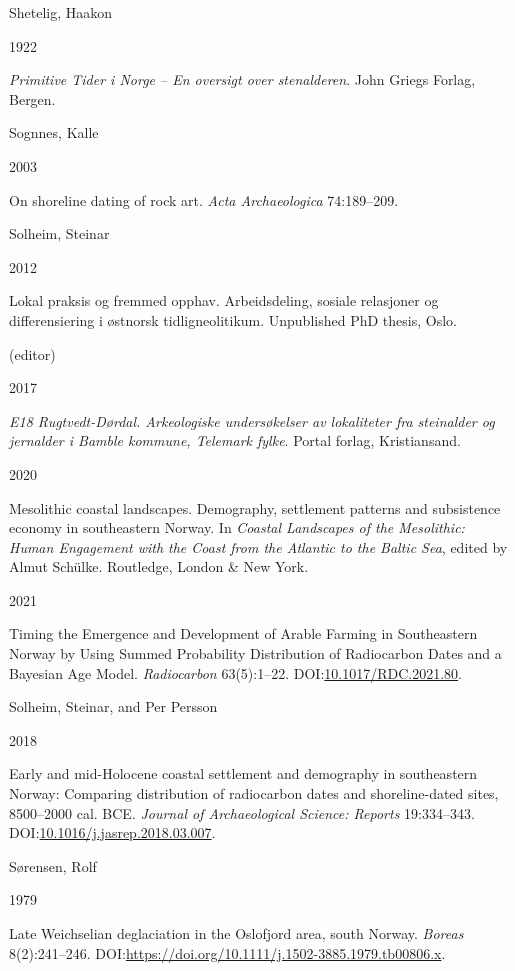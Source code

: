 \documentclass[
]{article}
\newlength{\cslhangindent}
\newlength{\csllabelwidth}
\newlength{\cslentryspacingunit} %
\newenvironment{CSLReferences}[2] %
 {%
  \setlength{\parindent}{0pt}
  \ifodd #1
  \let\oldpar\par
  \def\par{\hangindent=\cslhangindent\oldpar}
  \fi
  \setlength{\parskip}{#2\cslentryspacingunit}
 }%
 {}
\newcommand{\CSLBlock}[1]{#1\hfill\break}
\newcommand{\CSLLeftMargin}[1]{\parbox[t]{\csllabelwidth}{#1}}
\newcommand{\CSLRightInline}[1]{\parbox[t]{\linewidth - \csllabelwidth}{#1}\break}
\begin{document}
\begin{CSLReferences}{0}{0}
\leavevmode{}%
\CSLBlock{Shetelig, Haakon}
\CSLLeftMargin{ 1922}
\CSLRightInline{\emph{{Primitive Tider i Norge -- En oversigt over stenalderen}}. John Griegs Forlag, Bergen.}

\leavevmode{}%
\CSLBlock{Sognnes, Kalle}
\CSLLeftMargin{ 2003}
\CSLRightInline{On shoreline dating of rock art. \emph{Acta Archaeologica} 74:189--209.}

\leavevmode{}%
\CSLBlock{Solheim, Steinar}
\CSLLeftMargin{ 2012}
\CSLRightInline{{Lokal praksis og fremmed opphav. Arbeidsdeling, sosiale relasjoner og differensiering i østnorsk tidligneolitikum}. Unpublished PhD thesis, Oslo.}

\leavevmode{}%
\CSLBlock{ (editor)}
\CSLLeftMargin{ 2017}
\CSLRightInline{\emph{{E18 Rugtvedt-Dørdal. Arkeologiske undersøkelser av lokaliteter fra steinalder og jernalder i Bamble kommune, Telemark fylke}}. Portal forlag, Kristiansand.}

\leavevmode{}%
\CSLLeftMargin{ 2020 }
\CSLRightInline{{Mesolithic coastal landscapes. Demography, settlement patterns and subsistence economy in southeastern Norway}. In \emph{{Coastal Landscapes of the Mesolithic: Human Engagement with the Coast from the Atlantic to the Baltic Sea}}, edited by Almut Schülke. Routledge, London \& New York.}

\leavevmode{}%
\CSLLeftMargin{ 2021 }
\CSLRightInline{Timing the Emergence and Development of Arable Farming in Southeastern Norway by Using Summed Probability Distribution of Radiocarbon Dates and a Bayesian Age Model. \emph{Radiocarbon} 63(5):1--22. DOI:\href{https://doi.org/10.1017/RDC.2021.80}{10.1017/RDC.2021.80}.}

\leavevmode{}%
\CSLBlock{Solheim, Steinar, and Per Persson}
\CSLLeftMargin{ 2018}
\CSLRightInline{Early and mid-Holocene coastal settlement and demography in southeastern Norway: Comparing distribution of radiocarbon dates and shoreline-dated sites, 8500--2000 cal. BCE. \emph{Journal of Archaeological Science: Reports} 19:334--343. DOI:\href{https://doi.org/10.1016/j.jasrep.2018.03.007}{10.1016/j.jasrep.2018.03.007}.}

\leavevmode{}%
\CSLBlock{Sørensen, Rolf}
\CSLLeftMargin{ 1979}
\CSLRightInline{{Late Weichselian deglaciation in the Oslofjord area, south Norway}. \emph{Boreas} 8(2):241--246. DOI:\url{https://doi.org/10.1111/j.1502-3885.1979.tb00806.x}.}


\end{CSLReferences}
\end{document}
